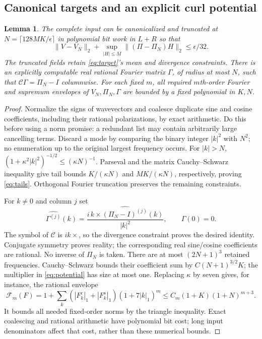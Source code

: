 \documentclass[11pt,a4paper]{amsart}
\newtheorem{lemma}[theorem]{Lemma}
\theoremstyle{definition}
\theoremstyle{remark}
\numberwithin{equation}{section}
\newcommand{\norm}[1]{\lVert #1\rVert}
\begin{document}
\subsection{Canonical targets and an explicit curl potential}
\begin{lemma}\label{lem:truncate}
The complete input can be canonicalized and truncated at
$N=\lceil128MK/\epsilon\rceil$ in polynomial bit work in $L+R$ so that
\begin{equation}\label{eq:tails}
 \norm{V-V_N}_2+\sup_{|H|\le M}\norm{(\Pi-\Pi_N)H}_2
 \le\epsilon/32.
\end{equation}
The truncated fields retain \eqref{eq:target}'s mean and divergence constraints.
There is an explicitly computable real rational Fourier matrix $\Gamma$, of
radius at most $N$, such that $\mathscr C\Gamma=\Pi_N-I$ columnwise.
For each fixed $m$, all required $m$th-order Fourier and supremum envelopes
of $V_N,\Pi_N,\Gamma$ are bounded by a fixed polynomial in $K,N$.
\end{lemma}
\begin{proof}
Normalize the signs of wavevectors and coalesce duplicate sine and cosine
coefficients, including their rational polarizations, by exact arithmetic.
Do this before using a norm promise: a redundant list may contain arbitrarily
large cancelling terms. Discard a mode by comparing the binary integer
$|k|^2$ with $N^2$; no enumeration up to the original largest frequency occurs.
For $|k|>N$, $(1+\kappa^2|k|^2)^{-1/2}\le(\kappa N)^{-1}$.
Parseval and the matrix Cauchy--Schwarz inequality give tail bounds
$K/(\kappa N)$ and $MK/(\kappa N)$, respectively, proving \eqref{eq:tails}.
Orthogonal Fourier truncation preserves the remaining constraints.

For $k\ne0$ and column $j$ set
\begin{equation}\label{eq:potential}
 \widehat{\Gamma^{(j)}}(k)=
 \frac{i\,k\times\widehat{(\Pi_N-I)^{(j)}}(k)}{|k|^2},
 \qquad\widehat\Gamma(0)=0.
\end{equation}
The symbol of $\mathscr C$ is $ik\times$, so the divergence constraint
proves the desired identity. Conjugate symmetry proves reality; the
corresponding real sine/cosine coefficients are rational. No inverse of
$\Pi_N$ is taken. There are at most $(2N+1)^3$ retained frequencies.
Cauchy--Schwarz bounds their coefficient sum by $C(N+1)^{3/2}K$;
the multiplier in \eqref{eq:potential} has size at most one.
Replacing $\kappa$ by seven gives, for instance, the rational envelope
\begin{equation}\label{eq:envelope}
 \mathcal F_m(F)=1+\sum_k
 (|F_k^c|_1+|F_k^s|_1)(1+7|k|_1)^m
 \le C_m(1+K)(1+N)^{m+3}.
\end{equation}
It bounds all needed fixed-order norms by the triangle inequality.
Exact coalescing and rational arithmetic have polynomial bit cost; long
input denominators affect that cost, rather than these numerical bounds.
\end{proof}
\end{document}
